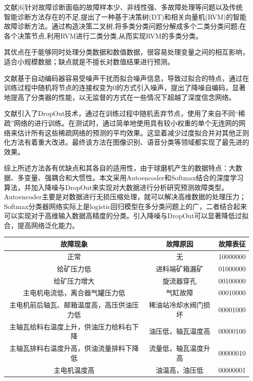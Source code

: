 \documentclass{ctacn}%
\begin{document}
\begin{multicols}{2}
文献[6]针对故障诊断面临的故障样本少、非线性强、多故障处理等问题以及传统智能诊断方法存在的不足,提出了一种基于决策树(DT)和相关向量机(RVM)的智能故障诊断方法。通过构造决策二叉树,将多类分类问题分解成多个二类分类问题;在各个决策节点,利用RVM进行二类分类,从而实现RVM的多类分类。

其优点在于能够同时处理分类数据和数值数据，很容易处理变量之间的相互影响，适合小规模数据；缺点就是不擅长对数值结果进行预测。

文献\cite{vincent2010stacked}基于自动编码器容易受噪声干扰而拟合噪声信息，导致过拟合的特点，通过在训练过程中随机将节点的连接权变为0的方式引入噪声，提出了降噪自编码，显著地提高了分类器的性能，以无监督的方式在一些情况下超越了深度信念网络。

文献\cite{srivastava2014dropout}引入了DropOut技术，通过在训练过程中随机丢弃节点，使用了来自不同“稀疏”网络的进行训练。在测试时，通过简单地使用具有较小权重的单个无连网的网络来估计所有这些稀疏网络的预测的平均效果。这显着减少过度拟合并对其他正则化方法有着重大改进。最终该方法在图像识别、语音分类等领域都实现了最先进的效果。

综上所述方法各有优缺点和其各自的适用性，由于球磨机产生的数据特点：大数据、多变量、强耦合和大惯性。本文采用Autoencoder和Softmax结合的深度学习算法，并加入降噪与DropOut来实现对大数据进行分析研究预测故障类型。Autoencoder主要是对数据进行无损压缩处理，就可以解决高维数据的处理压力；Softmax分类器网络实际上是logistic回归模型在多分类问题上的广，二者结合起来可以实现对于高维输入数据高精度的分类。引入降噪与DropOut可以显著降低过拟合，提高网络泛化能力。


\end{multicols}
\begin{center}
	\renewcommand\tabcolsep{12.6pt}%
	\label{tab1}
	\renewcommand\tabcolsep{10pt}
	\begin{tabular}{ccc}\toprule
	故障现象&故障原因&故障表征\\
	\hline
	正常&无&10000000\\
	给矿压力低&进料端矿箱漏矿&01000000\\
	给矿压力增大&旋流器穿孔&00100000\\
	主电机电流低，离合器气罐压力低&气缸故障&00010000\\
	主电机前后轴瓦、邮箱温度高，高压供油压力低&稀油站冷却水阀门损坏&00001000\\
	主轴瓦给料右温度上升，供油压力给料右下降&油压低，轴瓦温度高&00000100\\
	主轴瓦排料右温度升高，供油流量排料下降低&流量低，轴瓦温度升高&00000010\\
	主电机温度高&油温高，油压低&00000001\\
	\bottomrule
	\end{tabular}
\end{center}
\end{document}

